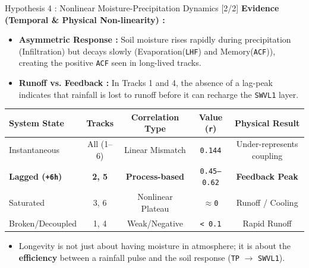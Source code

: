 \documentclass[8pt, aspectratio=169]{beamer}
\begin{document}
\begin{frame}{Hypothesis 4 : Nonlinear Moisture-Precipitation Dynamics [2/2]}
    \footnotesize
    \textbf{Evidence (Temporal \& Physical Non-linearity) :}
    \begin{itemize}
        \item \textbf{Asymmetric Response :} Soil moisture rises rapidly during precipitation (Infiltration) but decays slowly (Evaporation(\texttt{LHF}) and Memory(\texttt{ACF})), creating the positive \texttt{ACF} seen in long-lived tracks.
        \item \textbf{Runoff vs. Feedback :} In Tracks 1 and 4, the absence of a lag-peak indicates that rainfall is lost to runoff before it can recharge the \texttt{SWVL1} layer. \cite{clapp1978empirical}
    \end{itemize}

    \vspace{0.1cm}
    \begin{center}
        \begin{tabular}{lcccc}
            \toprule
            \textbf{System State} & \textbf{Tracks} & \textbf{Correlation Type} & \textbf{Value (\texttt{r})} & \textbf{Physical Result} \\
            \midrule
            Instantaneous & All (1--6) & Linear Mismatch & \texttt{0.144} & Under-represents coupling \\
            \textbf{Lagged (\texttt{+6h})} & \textbf{2, 5} & \textbf{Process-based} & \texttt{0.45--0.62} & \textbf{Feedback Peak} \\
            Saturated & 3, 6 & Nonlinear Plateau & \texttt{$\approx$0} & Runoff / Cooling \\
            Broken/Decoupled & 1, 4 & Weak/Negative & \texttt{< 0.1} & Rapid Runoff \\
            \bottomrule
        \end{tabular}
    \end{center}

    \vspace{0.3cm}
    \footnotesize
    \begin{itemize}
        \item Longevity is not just about having moisture in atmosphere; it is about the \textbf{efficiency} between a rainfall pulse and the soil response (\texttt{TP} $\rightarrow$ \texttt{SWVL1}).
    \end{itemize}
\end{frame}
\end{document}
